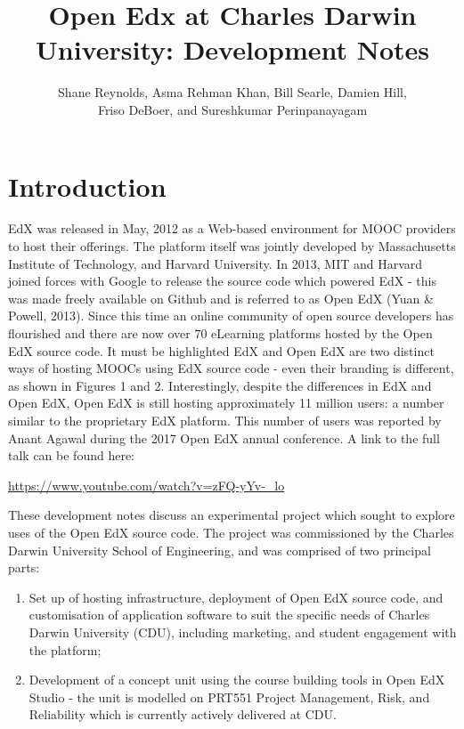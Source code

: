 \documentclass[a4paper]{article}
\begin{document}
\title{Open Edx at Charles Darwin University: Development Notes}
\author{Shane Reynolds, Asma Rehman Khan, Bill Searle, Damien Hill,\\ Friso DeBoer, and Sureshkumar Perinpanayagam}
\maketitle
\tableofcontents

\newpage
\section{Introduction}
EdX was released in May, 2012 as a Web-based environment for MOOC providers to host their offerings. The platform itself was jointly developed by Massachusetts Institute of Technology, and Harvard University. In 2013, MIT and Harvard joined forces with Google to release the source code which powered EdX - this was made freely available on Github and is referred to as Open EdX (Yuan \& Powell, 2013). Since this time an online community of open source developers has flourished and there are now over 70 eLearning platforms hosted by the Open EdX source code. It must be highlighted EdX and Open EdX are two distinct ways of hosting MOOCs using EdX source code - even their branding is different, as shown in Figures 1 and 2. Interestingly, despite the differences in EdX and Open EdX, Open EdX is still hosting approximately 11 million users: a number similar to the proprietary EdX platform. This number of users was reported by Anant Agawal during the 2017 Open EdX annual conference. A link to the full talk can be found here:

\begin{center}
\url{https://www.youtube.com/watch?v=zFQ-yYv-_lo}
\end{center}

These development notes discuss an experimental project which sought to explore uses of the Open EdX source code. The project was commissioned by the Charles Darwin University School of Engineering, and was comprised of two principal parts:
\begin{enumerate}
\item Set up of hosting infrastructure, deployment of Open EdX source code, and customisation of application software to suit the specific needs of Charles Darwin University (CDU), including marketing, and student engagement with the platform; 
\item Development of a concept unit using the course building tools in Open EdX Studio - the unit is modelled on PRT551 Project Management, Risk, and Reliability which is currently actively delivered at CDU.
\end{enumerate}
\end{document}
